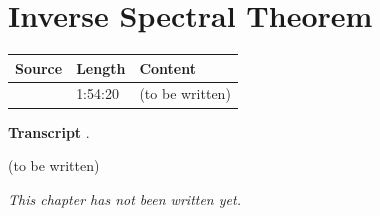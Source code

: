 \chapter{Inverse Spectral Theorem}\label{ch:c30}
\begin{paracol}{2}

\begin{sources}
\begin{tabularx}{\linewidth}{@{}l l L@{}}
\toprule
\textbf{Source} & \textbf{Length} & \textbf{Content}\\
\midrule
{} & 1:54:20 & (to be written)\\
\bottomrule
\end{tabularx}

\smallskip
\textbf{Transcript} .
\end{sources}

\begin{reading}
(to be written)
\end{reading}

\emph{This chapter has not been written yet.}

\flushside
\end{paracol}
